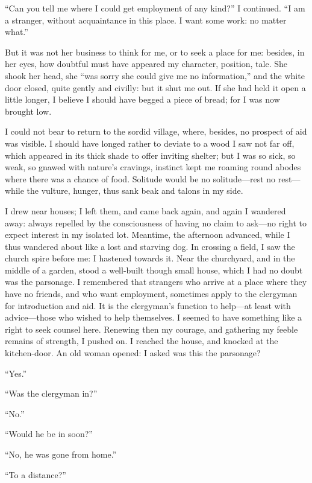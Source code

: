 \enquote{Can you tell me where I could get employment of any kind?} I
continued. \enquote{I am a stranger, without acquaintance in this
place. I want some work: no matter what.}

But it was not her business to think for me, or to seek a place for me:
besides, in her eyes, how doubtful must have appeared my character,
position, tale. She shook her head, she \enquote{was sorry she could
give me no information,} and the white door closed, quite gently and
civilly: but it shut me out. If she had held it open a little longer, I
believe I should have begged a piece of bread; for I was now brought
low.

I could not bear to return to the sordid village, where, besides, no
prospect of aid was visible. I should have longed rather to deviate to
a wood I saw not far off, which appeared in its thick shade to offer
inviting shelter; but I was so sick, so weak, so gnawed with nature's
cravings, instinct kept me roaming round abodes where there was a chance
of food. Solitude would be no solitude---rest no rest---while the
vulture, hunger, thus sank beak and talons in my side.

I drew near houses; I left them, and came back again, and again I
wandered away: always repelled by the consciousness of having no claim
to ask---no right to expect interest in my isolated lot. Meantime, the
afternoon advanced, while I thus wandered about like a lost and starving
dog. In crossing a field, I saw the church spire before me: I hastened
towards it. Near the churchyard, and in the middle of a garden, stood a
well-built though small house, which I had no doubt was the parsonage. 
I remembered that strangers who arrive at a place where they have no
friends, and who want employment, sometimes apply to the clergyman for
introduction and aid. It is the clergyman's function to help---at least
with advice---those who wished to help themselves. I seemed to have
something like a right to seek counsel here. Renewing then my courage,
and gathering my feeble remains of strength, I pushed on. I reached the
house, and knocked at the kitchen-door. An old woman opened: I asked
was this the parsonage?

\enquote{Yes.}

\enquote{Was the clergyman in?}

\enquote{No.}

\enquote{Would he be in soon?}

\enquote{No, he was gone from home.}

\enquote{To a distance?}

